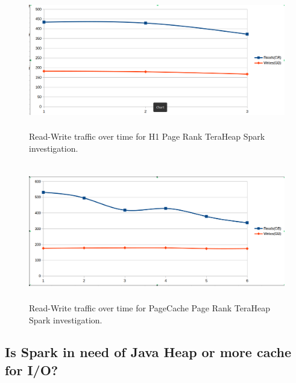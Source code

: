 \begin{figure}[ht!]
    \includegraphics[width=12cm,height=6cm]{./fig/rw_pr_h1_th.png}
    \caption{Read-Write traffic over time for H1 Page Rank TeraHeap
    Spark investigation.}
    \label{fig:rw_pr_h1_th}
\end{figure}

\begin{figure}[ht!]
    \includegraphics[width=12cm,height=6cm]{./fig/rw_pr_pc_th.png}
    \caption{Read-Write traffic over time for PageCache Page Rank
    TeraHeap Spark investigation.}
    \label{fig:rw_pr_pc_th}
\end{figure}


\subsection{Is Spark in need of Java Heap or more cache for I/O?}

